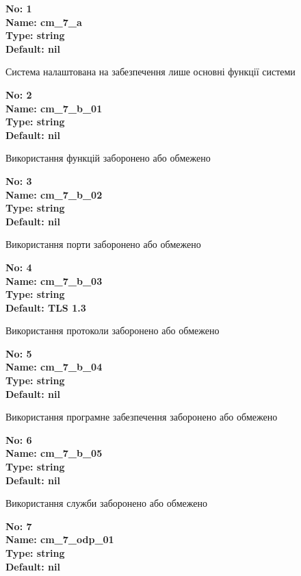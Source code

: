 \documentclass{article}
\begin{document}
\vspace{10pt}
{\footnotesize\bfseries
No: 1\\
Name: cm\_\allowbreak{}7\_\allowbreak{}a\\
Type: string\\
Default: nil
}

{\footnotesize Система налаштована на забезпечення лише основні функції системи }


{\footnotesize\bfseries
No: 2\\
Name: cm\_\allowbreak{}7\_\allowbreak{}b\_\allowbreak{}01\\
Type: string\\
Default: nil
}

{\footnotesize Використання функцій заборонено або обмежено}


{\footnotesize\bfseries
No: 3\\
Name: cm\_\allowbreak{}7\_\allowbreak{}b\_\allowbreak{}02\\
Type: string\\
Default: nil
}

{\footnotesize Використання порти заборонено або обмежено}


{\footnotesize\bfseries
No: 4\\
Name: cm\_\allowbreak{}7\_\allowbreak{}b\_\allowbreak{}03\\
Type: string\\
Default: \textquotedbl{}TLS 1.3\textquotedbl{}
}

{\footnotesize Використання протоколи заборонено або обмежено}


{\footnotesize\bfseries
No: 5\\
Name: cm\_\allowbreak{}7\_\allowbreak{}b\_\allowbreak{}04\\
Type: string\\
Default: nil
}

{\footnotesize Використання програмне забезпечення заборонено або обмежено}


{\footnotesize\bfseries
No: 6\\
Name: cm\_\allowbreak{}7\_\allowbreak{}b\_\allowbreak{}05\\
Type: string\\
Default: nil
}

{\footnotesize Використання служби заборонено або обмежено}


{\footnotesize\bfseries
No: 7\\
Name: cm\_\allowbreak{}7\_\allowbreak{}odp\_\allowbreak{}01\\
Type: string\\
Default: nil
}
\end{document}
